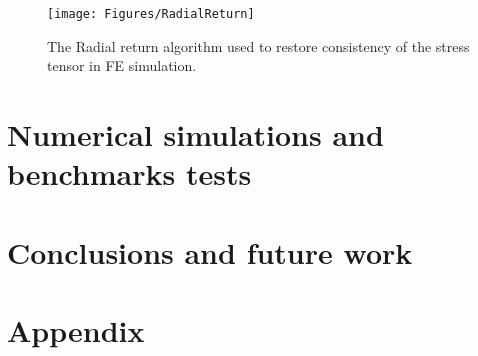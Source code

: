 \documentclass[algorithms,article,submit,pdftex,moreauthors]{Definitions/mdpi}
\begin{document}
\begin{figure}[!ht]
\centering
\texttt{[image: Figures/RadialReturn]}
\caption{The Radial return algorithm used to restore consistency of the stress tensor in FE simulation.}
\label{fig:RadialReturn}
\end{figure}

\section{Numerical simulations and benchmarks tests}\label{sec:Simulations}

\section{Conclusions and future work}\label{sec:Conclusions}






\section*{Appendix\label{sec:Appendix}}
\end{document}
